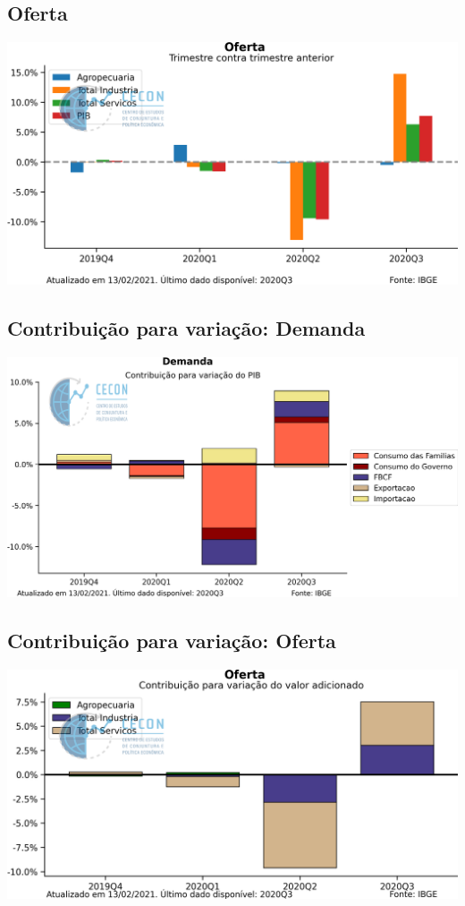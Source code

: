 \documentclass{SelfArx}
\begin{document}
\subsection*{Oferta}
\label{sec:org11f1b72}


\begin{center}
\includegraphics[width=.9\linewidth]{./figs/PIB/Oferta.png}
\end{center}


\subsection*{Contribuição para variação: Demanda}
\label{sec:orgb2575f1}

\begin{center}
\includegraphics[width=.9\linewidth]{./figs/PIB/Contrib_Demanda.png}
\end{center}

\subsection*{Contribuição para variação: Oferta}
\label{sec:org110ff1f}

\begin{center}
\includegraphics[width=.9\linewidth]{./figs/PIB/Contrib_Oferta.png}
\end{center}
\end{document}
